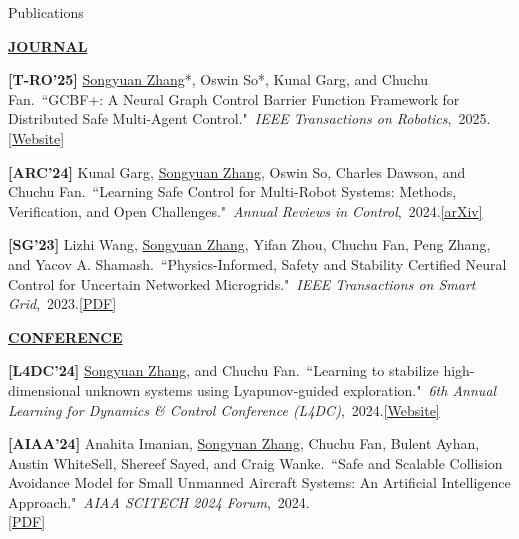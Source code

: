 \documentclass{resume} %
\newcommand{\paperItem}[4]{#1.~``#2."~\textit{#3},~#4.}%
\newcommand{\me}{\underline{Songyuan Zhang}}
\newcommand{\meshort}{\textbf{S. Zhang}}
\newcommand{\person}[2]{#1}
\begin{document}
	\begin{rSection}{Publications}
		\item[] \textbf{\underline{JOURNAL}}
		\vspace{5pt}
		{
			\item {\bf [T-RO'25]}
			\paperItem{\person{\me*}{\meshort}, \person{Oswin So*}{O. So}, \person{Kunal Garg}{K. Garg}, and \person{Chuchu Fan}{C. Fan}}{GCBF+: A Neural Graph Control Barrier Function Framework for Distributed Safe Multi-Agent Control}{IEEE Transactions on Robotics}{2025}{\href{https://mit-realm.github.io/gcbfplus-website/}{[Website]}}
			\item {\bf [ARC'24]}
			\paperItem{\person{Kunal Garg}{K. Garg}, \person{\me}{\meshort}, \person{Oswin So}{O. So}, \person{Charles Dawson}{C. Dawson}, and \person{Chuchu Fan}{C. Fan}}{Learning Safe Control for Multi-Robot Systems: Methods, Verification, and Open Challenges}{Annual Reviews in Control}{2024}{\href{https://arxiv.org/abs/2311.13714}{[arXiv]}}
			\item {\bf [SG'23]}
			\paperItem{\person{Lizhi Wang}{L. Wang}, \person{\me}{\meshort}, \person{Yifan Zhou}{Y. Zhou}, \person{Chuchu Fan}{C. Fan}, \person{Peng Zhang}{P. Zhang}, and \person{Yacov A. Shamash}{YA. Shamash}}{Physics-Informed, Safety and Stability Certified Neural Control for Uncertain Networked Microgrids}{IEEE Transactions on Smart Grid}{2023}{\href{https://ieeexplore.ieee.org/stamp/stamp.jsp?arnumber=10233047}{[PDF]}}
		}
		\vspace{5pt}
		\item[] \textbf{\underline{CONFERENCE}}
		\vspace{5pt}
		{	
			\item {\bf [L4DC'24]}
			\paperItem{\person{\me}{\meshort}, and \person{Chuchu Fan}{C. Fan}}{Learning to stabilize high-dimensional unknown systems using Lyapunov-guided exploration}{6th Annual Learning for Dynamics \& Control Conference (L4DC)}{2024}{\href{https://mit-realm.github.io/lyge-website/}{[Website]}}
			\item {\bf [AIAA'24]}
			\paperItem{\person{Anahita Imanian}{A. Imanian}, \person{\me}{\meshort}, \person{Chuchu Fan}{C. Fan}, \person{Bulent Ayhan}{B. Ayhan}, \person{Austin WhiteSell}{A. WhiteSell}, \person{Shereef Sayed}{S. Sayed}, and \person{Craig Wanke}{C. Wanke}}{Safe and Scalable Collision Avoidance Model for Small Unmanned Aircraft Systems: An Artificial Intelligence Approach}{AIAA SCITECH 2024 Forum}{2024}\\{\href{https://arc.aiaa.org/doi/abs/10.2514/6.2024-1081}{[PDF]}}
}
\end{rSection}
\end{document}
